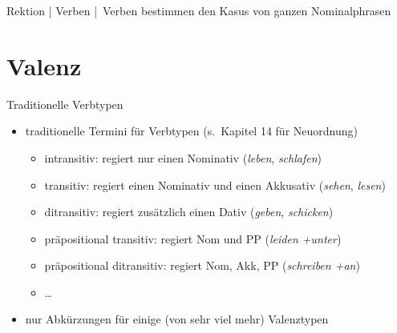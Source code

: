 \begin{frame}
  {Rektion | Verben}
  \onslide<+->
  \onslide<+->
   | Verben bestimmen den Kasus von ganzen \alert{Nominalphrasen}\\
  \Zeile
  \Zeile
  \centering 
  \onslide<+->
\end{frame}


\section{Valenz}

\begin{frame}
  {Traditionelle Verbtypen}
  \pause
  \begin{itemize}[<+->]
    \item traditionelle Termini für Verbtypen (s.\ Kapitel 14 für Neuordnung)
      \Halbzeile
      \begin{itemize}[<+->]
        \item \alert{intransitiv}: regiert nur einen Nominativ (\textit{leben}, \textit{schlafen})
          \Viertelzeile
        \item \alert{transitiv}: regiert einen Nominativ und einen Akkusativ (\textit{sehen}, \textit{lesen})
          \Viertelzeile
        \item \alert{ditransitiv}: regiert zusätzlich einen Dativ (\textit{geben}, \textit{schicken})
          \Viertelzeile
        \item \alert{präpositional transitiv}: regiert Nom und PP (\textit{leiden +unter})
          \Viertelzeile
        \item \alert{präpositional ditransitiv}: regiert Nom, Akk, PP (\textit{schreiben +an})
          \Viertelzeile
        \item \ldots
          \Zeile
      \end{itemize}
    \item nur Abkürzungen für einige (von sehr viel mehr) \alert{Valenztypen}
  \end{itemize}
\end{frame}

